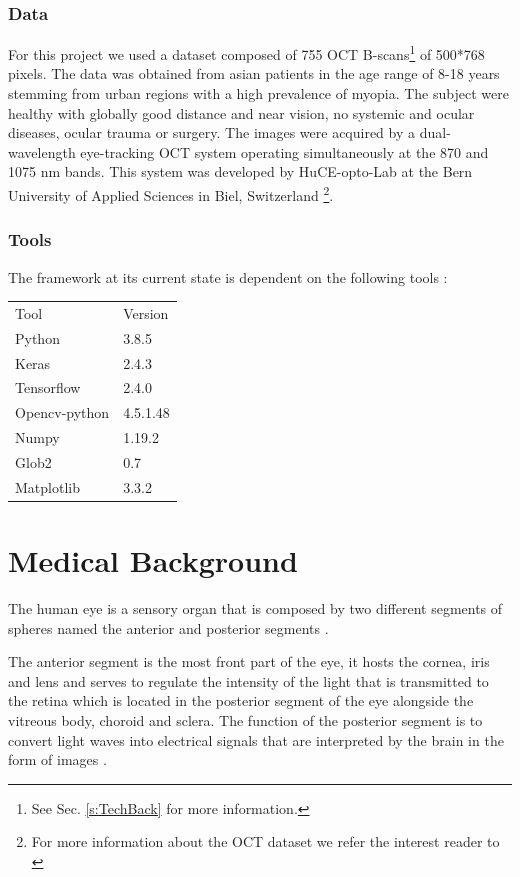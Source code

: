 \documentclass[12pt,a4paper]{scrartcl}
\begin{document}
\subsubsection{Data}

For this project we used a dataset composed of 755 OCT B-scans\footnote{See Sec. \ref{s:TechBack} for more information.} of 500*768 pixels. The data was obtained from asian patients in the age range of 8-18 years stemming from urban regions with a high prevalence of myopia. The subject were healthy with globally good distance and near vision, no systemic and ocular diseases, ocular trauma or surgery\cite{Ronchetti2019}. The images were acquired by a dual-wavelength eye-tracking OCT system operating simultaneously at the 870 and 1075 nm bands. This system was developed by HuCE-opto-Lab at the Bern University of Applied Sciences in Biel, Switzerland \cite{Ronchetti2019} \footnote{For more information about the OCT dataset we refer the interest reader to \cite{Ronchetti2019}}.

\subsubsection{Tools}
The framework at its current state is dependent on the following tools : 
    
    \begin{table}[H]
    \begin{tabular}{ll}
    Tool & Version \\
    Python & 3.8.5 \\
    Keras     & 2.4.3   \\
    Tensorflow & 2.4.0 \\
    Opencv-python  &   4.5.1.48 \\
    Numpy & 1.19.2 \\
    Glob2  &  0.7 \\
    Matplotlib & 3.3.2
    \end{tabular}
    \end{table}



\section{Medical Background}\label{s:medical_background}

The human eye is a sensory organ that is composed by two different segments of spheres named the anterior and posterior segments \cite{snell1998}.

The anterior segment is the most front part of the eye, it hosts the cornea, iris and lens and serves to regulate the intensity of the light that is transmitted to the retina which is located in the posterior segment of the eye alongside the vitreous body, choroid and sclera. The function of the posterior segment is to convert light waves into electrical signals that are interpreted by the brain in the form of images \cite{Rhoades2017}. 
\end{document}
